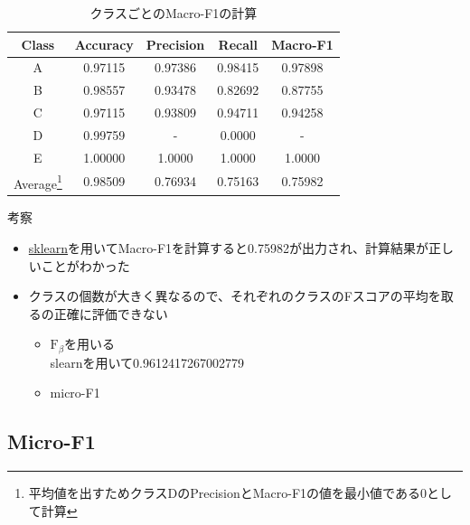 \documentclass[leno,xcolor=dvipsnames]{beamer}
\begin{document}
  \begin{frame}
    \begin{table}[H]
      \centering
      \caption{クラスごとのMacro-F1の計算} \label{tb:macro-F1}
      \begin{tabular}{ccccc}
        \toprule
        Class & Accuracy & Precision & Recall & Macro-F1 \\
        \midrule
        A & 0.97115 & 0.97386 & 0.98415 & 0.97898 \\
        B & 0.98557 & 0.93478 & 0.82692 & 0.87755 \\
        C & 0.97115 & 0.93809 & 0.94711 & 0.94258 \\
        D & 0.99759 & - & 0.0000 & - \\
        E & 1.00000 & 1.0000 & 1.0000 & 1.0000 \\
        \midrule
        Average\footnote{平均値を出すためクラスDのPrecisionとMacro-F1の値を最小値である0として計算} & 0.98509 & 0.76934 & 0.75163 & 0.75982 \\
        \bottomrule
      \end{tabular}
    \end{table}
  \end{frame}

  \begin{frame}{考察}
    \begin{itemize}
      \item \href{https://scikit-learn.org/stable/modules/generated/sklearn.metrics.f1_score.html}{sklearn}を用いてMacro-F1を計算すると0.75982が出力され、計算結果が正しいことがわかった
      \item クラスの個数が大きく異なるので、それぞれのクラスのFスコアの平均を取るの正確に評価できない
      \begin{itemize}
        \item \href{https://www.ibm.com/docs/en/cloud-paks/cp-data/3.5.0?topic=overview-weighted-f1-measure}{$\mathrm{F}_{\beta}$}を用いる \mbox{}\\ slearnを用いて0.9612417267002779
        \item micro-F1
      \end{itemize}
    \end{itemize}
  \end{frame}

  \begin{frame}
    \section{Micro-F1}
  \end{frame}
  
\end{document}
